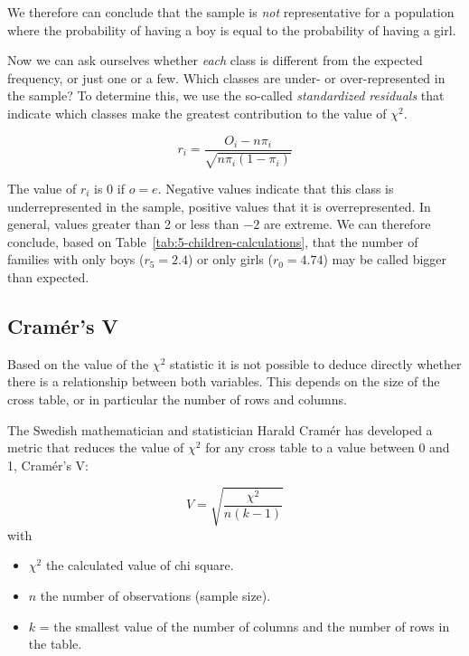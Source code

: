 We therefore can conclude that the sample is \emph{not} representative for a population where the probability of having a boy is equal to the probability of having a girl.

Now we can ask ourselves whether \emph{each} class is different from the expected frequency, or just one or a few. Which classes are under- or over-represented in the sample? To determine this, we use the so-called \emph{standardized residuals} that indicate which classes make the greatest contribution to the value of $\chi^2$.

\[ r_{i} = \frac{O_{i} - n \pi_{i}}{\sqrt{n \pi_{i}(1-\pi_{i})}} \]

%  

The value of $r_i$ is 0 if $o = e$. Negative values indicate that this class is underrepresented in the sample, positive values that it is overrepresented. In general, values greater than 2 or less than $-2$ are extreme. We can therefore conclude, based on Table~\ref{tab:5-children-calculations}, that the number of families with only boys ($r_5 = 2.4$) or only girls ($r_0 = 4.74$) may be called bigger than expected.

\subsection{Cramér's V}
\label{ssec:cramers-v}

Based on the value of the $\chi^2$ statistic it is not possible to deduce directly whether there is a relationship between both variables. This depends on the size of the cross table, or in particular the number of rows and columns.

The Swedish mathematician and statistician Harald Cramér has developed a metric that reduces the value of $\chi^2 $ for any cross table to a value between 0 and 1, Cramér's V:

\begin{definition}[Cramér's V]
  \begin{equation}
  V = \sqrt{\frac{\chi^{2}}{n (k-1)}}
  \label{eq:Cramer}
  \end{equation}
  with
  \begin{itemize}
    \item $\chi^{2}$ the calculated value of chi square.
    \item $n$ the number of observations (sample size).
    \item $k$ = the smallest value of the number of columns and the number of rows in the table.
  \end{itemize}
  
\end{definition}

